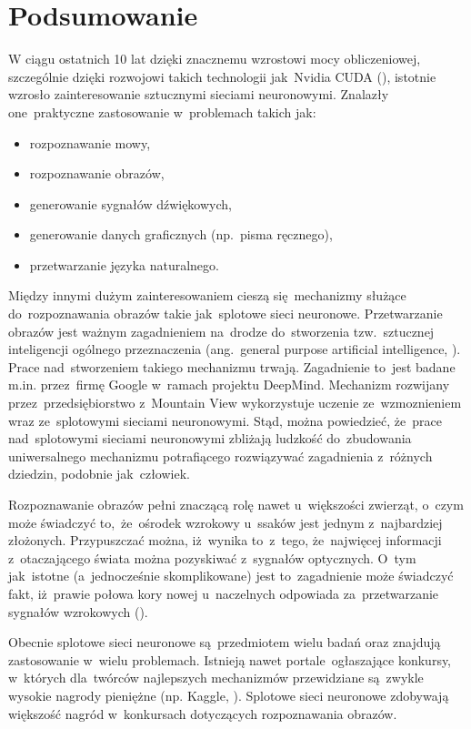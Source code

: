 \chapter{Podsumowanie}
W ciągu ostatnich 10 lat dzięki znacznemu wzrostowi mocy obliczeniowej, szczególnie dzięki rozwojowi takich technologii
jak~Nvidia CUDA (\cite{nvidia-cuda}), istotnie wzrosło zainteresowanie sztucznymi sieciami neuronowymi. Znalazły
one~praktyczne zastosowanie w~problemach takich jak:
\begin{itemize}
    \item rozpoznawanie mowy,
    \item rozpoznawanie obrazów,
    \item generowanie sygnałów dźwiękowych,
    \item generowanie danych graficznych (np.~pisma ręcznego),
    \item przetwarzanie języka naturalnego.
\end{itemize}

Między innymi dużym zainteresowaniem cieszą się~mechanizmy służące do~rozpoznawania obrazów takie jak~splotowe sieci
neuronowe. Przetwarzanie obrazów jest ważnym zagadnieniem na~drodze do~stworzenia tzw.~sztucznej inteligencji ogólnego
przeznaczenia (ang.~general purpose artificial intelligence, \cite{strong-AI}). Prace nad~stworzeniem takiego mechanizmu
trwają. Zagadnienie to~jest badane m.in. przez~firmę Google w~ramach projektu DeepMind. Mechanizm rozwijany
przez~przedsiębiorstwo z~Mountain View wykorzystuje uczenie ze~wzmoznieniem wraz ze~splotowymi sieciami neuronowymi.
Stąd, można powiedzieć, że~prace nad~splotowymi sieciami neuronowymi zbliżają ludzkość do~zbudowania uniwersalnego
mechanizmu potrafiącego rozwiązywać zagadnienia z~różnych dziedzin, podobnie jak~człowiek.

Rozpoznawanie obrazów pełni znaczącą rolę nawet u~większości zwierząt, o~czym może świadczyć to,~że~ośrodek wzrokowy
u~ssaków jest jednym z~najbardziej złożonych. Przypuszczać można, iż~wynika to~z~tego, że~najwięcej informacji
z~otaczającego świata można pozyskiwać z~sygnałów optycznych. O~tym jak~istotne (a~jednocześnie skomplikowane) jest
to~zagadnienie może świadczyć fakt, iż~prawie połowa kory nowej u~naczelnych odpowiada za~przetwarzanie sygnałów
wzrokowych (\cite{primate-cerebral-cortex}).

Obecnie splotowe sieci neuronowe są~przedmiotem wielu badań oraz znajdują zastosowanie w~wielu problemach. Istnieją
nawet portale~ogłaszające konkursy, w~których dla~twórców najlepszych mechanizmów przewidziane są~zwykle wysokie nagrody
pieniężne (np. Kaggle, \cite{kaggle-competitions}). Splotowe sieci neuronowe zdobywają większość nagród w~konkursach
dotyczących rozpoznawania obrazów.

